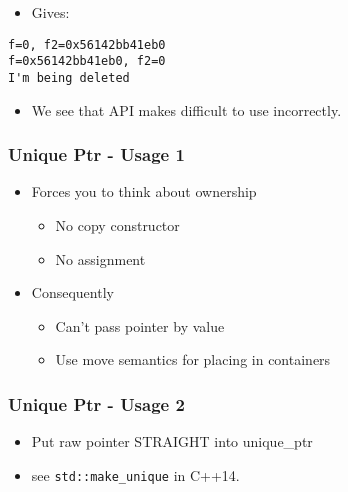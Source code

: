 \begin{itemize}
\tightlist
\item
  Gives:
\end{itemize}

\begin{verbatim}
f=0, f2=0x56142bb41eb0
f=0x56142bb41eb0, f2=0
I'm being deleted
\end{verbatim}

\begin{itemize}
\tightlist
\item
  We see that API makes difficult to use incorrectly.
\end{itemize}

\hypertarget{unique-ptr---usage-1}{%
\subsubsection{Unique Ptr - Usage 1}\label{unique-ptr---usage-1}}

\begin{itemize}
\tightlist
\item
  Forces you to think about ownership

  \begin{itemize}
  \tightlist
  \item
    No copy constructor
  \item
    No assignment
  \end{itemize}
\item
  Consequently

  \begin{itemize}
  \tightlist
  \item
    Can't pass pointer by value
  \item
    Use move semantics for placing in containers
  \end{itemize}
\end{itemize}

\hypertarget{unique-ptr---usage-2}{%
\subsubsection{Unique Ptr - Usage 2}\label{unique-ptr---usage-2}}

\begin{itemize}
\tightlist
\item
  Put raw pointer STRAIGHT into unique\_ptr
\item
  see \texttt{std::make\_unique} in C++14.
\end{itemize}


